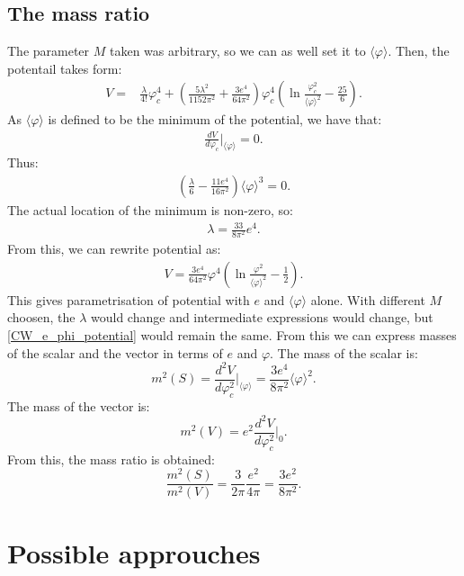 \subsection{The mass ratio}
The parameter $M$ taken was arbitrary, so we can as well set it to $\langle\varphi\rangle$.
Then, the potentail takes form: 
\begin{align}
V = &\frac{\lambda}{4!}\varphi_c^4
+\left(\frac{5\lambda^2}{1152\pi^2}+\frac{3e^4}{64\pi^2}\right)\varphi_c^4
\left(\ln\frac{\varphi_c^2}{\langle\varphi\rangle^2}-\frac{25}{6}\right). 
\end{align} 
As $\langle\varphi\rangle$ is defined to be the minimum of the potential, we have that:
\begin{align}
\frac{dV}{d\varphi_c}\Big|_{\langle\varphi\rangle} = 0.
\end{align} 
Thus:
\begin{align}
\left(\frac{\lambda}{6}-\frac{11e^4}{16\pi^2}\right)\langle\varphi\rangle^3 = 0.
\end{align}
The actual location of the minimum is non-zero, so:
\begin{align}
\lambda = \frac{33}{8\pi^2}e^4.
\end{align}
From this, we can rewrite potential as:
\begin{align}\label{CW_e_phi_potential}
V = \frac{3e^4}{64\pi^2}\varphi^4\left(\ln{\frac{\varphi^2}{\langle\varphi\rangle^2}-
\frac{1}{2}}\right).
\end{align}
This gives parametrisation of potential with $e$ and $\langle\varphi\rangle$ alone. 
With different $M$ choosen, the $\lambda$ would change and intermediate expressions would change, 
but \ref{CW_e_phi_potential} would remain the same.
From this we can express masses of the scalar and the vector in terms of $e$ and $\varphi$.
The mass of the scalar is:
\begin{equation}
m^2(S) = \frac{d^2V}{d\varphi_c^2}\Big|_{\langle\varphi\rangle} = 
\frac{3e^4}{8\pi^2}\langle\varphi\rangle^2.
\end{equation}
The mass of the vector is:
\begin{equation}
m^2(V) = e^2\frac{d^2V}{d\varphi_c^2}\Big|_0.
\end{equation}
From this, the mass ratio is obtained:
\begin{equation}
\frac{m^2(S)}{m^2(V)} = \frac{3}{2\pi}\frac{e^2}{4\pi} = \frac{3e^2}{8\pi^2}.
\end{equation}



\section{Possible approuches}


















